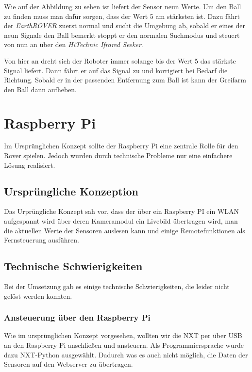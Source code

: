 Wie auf der Abbildung zu sehen ist liefert der Sensor neun Werte. Um den Ball zu finden muss man dafür sorgen, dass der Wert 5 am stärksten ist. Dazu fährt der \textit{EarthROVER} zuerst normal und sucht die Umgebung ab, sobald er eines der neun Signale den Ball bemerkt stoppt er den normalen Suchmodus und steuert von nun an über den \textit{HiTechnic Ifrared Seeker}.

Von hier an dreht sich der Roboter immer solange bis der Wert 5 das stärkste Signal liefert. Dann fährt er auf das Signal zu und korrigiert bei Bedarf die Richtung. Sobald er in der passenden Entfernung zum Ball ist kann der Greifarm den Ball dann aufheben.

\section{Raspberry Pi}

Im Ursprünglichen Konzept sollte der Raspberry Pi eine zentrale Rolle für den Rover spielen. Jedoch wurden durch technische Probleme nur eine einfachere Lösung realisiert.

\subsection{Ursprüngliche Konzeption} 

Das Urprüngliche Konzept sah vor, dass der über ein Raspberry PI ein WLAN aufgespannt wird über deren Kameramodul ein Livebild übertragen wird, man die aktuellen Werte der Sensoren auslesen kann und einige Remotefunktionen als Fernsteuerung ausführen.

\subsection{Technische Schwierigkeiten}

Bei der Umsetzung gab es einige technische Schwierigkeiten, die leider nicht gelöst werden konnten.

\subsubsection{Ansteuerung über den Raspberry Pi}

Wie im ursprünglichen Konzept vorgesehen, wollten wir die NXT per über USB an den Raspberry Pi anschließen und ansteuern. Als Programmiersprache wurde dazu NXT-Python ausgewählt. Dadurch was es auch nicht möglich, die Daten der Sensoren auf den Webserver zu übertragen.

